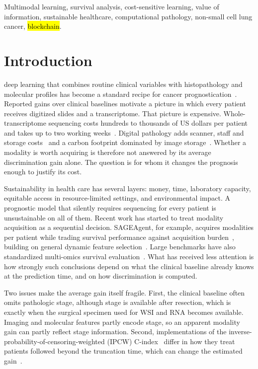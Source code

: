 \documentclass[journal,twoside,web]{IEEEtran}
\newcommand{\bc}[1]{\hl{#1}}
\newcommand{\bc}[1]{#1}
\begin{document}
\begin{IEEEkeywords}
Multimodal learning, survival analysis, cost-sensitive learning, value of information, sustainable healthcare, computational pathology, non-small cell lung cancer, \bc{blockchain}.
\end{IEEEkeywords}

\section{Introduction}
 deep learning that combines routine clinical variables with histopathology and molecular profiles has become a standard recipe for cancer prognostication~\cite{cheerla2019,chen2022,valesilva2021}. Reported gains over clinical baselines motivate a picture in which every patient receives digitized slides and a transcriptome. That picture is expensive. Whole-transcriptome sequencing costs hundreds to thousands of US dollars per patient and takes up to two working weeks~\cite{altburger2026,ortendahl2025,cuppen2022}. Digital pathology adds scanner, staff and storage costs~\cite{ardon2023} and a carbon footprint dominated by image storage~\cite{tilmant2026,vafaeisadr2024}. Whether a modality is worth acquiring is therefore not answered by its average discrimination gain alone. The question is for whom it changes the prognosis enough to justify its cost.

Sustainability in health care has several layers: money, time, laboratory capacity, equitable access in resource-limited settings, and environmental impact. A prognostic model that silently requires sequencing for every patient is unsustainable on all of them. Recent work has started to treat modality acquisition as a sequential decision. SAGEAgent, for example, acquires modalities per patient while trading survival performance against acquisition burden~\cite{qu2026}, building on general dynamic feature selection~\cite{covert2023,ji2007,shim2018}. Large benchmarks have also standardized multi-omics survival evaluation~\cite{wissel2025}. What has received less attention is how strongly such conclusions depend on what the clinical baseline already knows at the prediction time, and on how discrimination is computed.

Two issues make the average gain itself fragile. First, the clinical baseline often omits pathologic stage, although stage is available after resection, which is exactly when the surgical specimen used for WSI and RNA becomes available. Imaging and molecular features partly encode stage, so an apparent modality gain can partly reflect stage information. Second, implementations of the inverse-probability-of-censoring-weighted (IPCW) C-index~\cite{uno2011} differ in how they treat patients followed beyond the truncation time, which can change the estimated gain~\cite{sonabend2022}.
\end{document}
